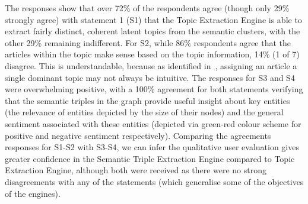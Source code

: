 The responses show that over 72\% of the respondents agree (though only 29\% strongly agree) with statement 1 (S1) that the Topic Extraction Engine is able to extract fairly distinct, coherent latent topics from the semantic clusters, with the other 29\% remaining indifferent. For S2, while 86\% respondents agree that the articles within the topic make sense based on the topic information, 14\% (1 of 7) disagree. This is understandable, because as identified in~, assigning an article a single dominant topic may not always be intuitive. The responses for S3 and S4 were overwhelming positive, with a 100\% agreement for both statements verifying that the semantic triples in the graph provide useful insight about key entities (the relevance of entities depicted by the size of their nodes) and the general sentiment associated with these entities (depicted via green-red colour scheme for positive and negative sentiment respectively). Comparing the agreements responses for S1-S2 with S3-S4, we can infer the qualitative user evaluation gives greater confidence in the Semantic Triple Extraction Engine compared to Topic Extraction Engine, although both were received as there were no strong disagreements with any of the statements (which generalise some of the objectives of the engines). 
